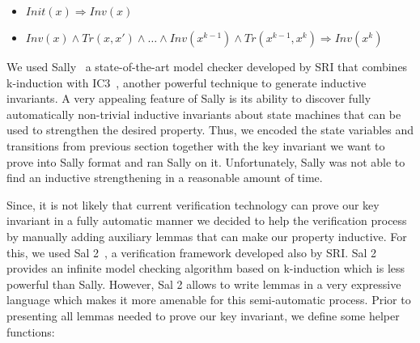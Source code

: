 \begin{itemize}
\item $Init(x) \Rightarrow Inv(x)$
\item $Inv(x) \wedge Tr(x,x') \wedge \ldots \wedge Inv(x^{k-1}) \wedge Tr(x^{k-1},x^{k}) \Rightarrow Inv(x^{k})$
\end{itemize}


We used Sally~\cite{sally} a state-of-the-art model checker developed
by SRI that combines k-induction with IC3~\cite{Bradley11}, another
powerful technique to generate inductive invariants. A very appealing
feature of Sally is its ability to discover fully automatically
non-trivial inductive invariants about state machines that can be used
to strengthen the desired property.
%
Thus, we encoded the state variables and transitions from previous
section together with the key invariant we want to prove into Sally
format and ran Sally on it. Unfortunately, Sally was not able to find
an inductive strengthening in a reasonable amount of time.

Since, it is not likely that current verification technology can prove
our key invariant in a fully automatic manner we decided to help the
verification process by manually adding auxiliary lemmas that can make
our property inductive.
%
For this, we used Sal 2~\cite{sal2}, a verification framework
developed also by SRI. Sal 2 provides an infinite model checking
algorithm based on k-induction which is less powerful than
Sally. However, Sal 2 allows to write lemmas in a very expressive
language which makes it more amenable for this semi-automatic
process. Prior to presenting all lemmas needed to prove our key
invariant, we define some helper functions:

\begin{minipage}{\linewidth}
\vspace{3mm}
\vspace{3mm}
\end{minipage}


